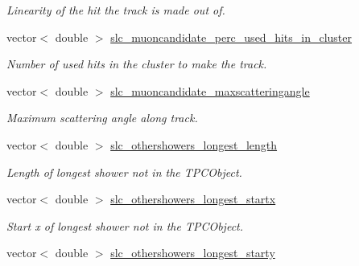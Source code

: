 \begin{DoxyCompactItemize}
\begin{DoxyCompactList}\small\item\em Linearity of the hit the track is made out of. \end{DoxyCompactList}\item 
\hypertarget{classUBXSecEvent_a946ace636527632fed09f2d9e075e87e}{vector$<$ double $>$ \hyperlink{classUBXSecEvent_a946ace636527632fed09f2d9e075e87e}{slc\-\_\-muoncandidate\-\_\-perc\-\_\-used\-\_\-hits\-\_\-in\-\_\-cluster}}\label{classUBXSecEvent_a946ace636527632fed09f2d9e075e87e}

\begin{DoxyCompactList}\small\item\em Number of used hits in the cluster to make the track. \end{DoxyCompactList}\item 
\hypertarget{classUBXSecEvent_ad1f8e0086022ff8db9be1bbe8860c6d1}{vector$<$ double $>$ \hyperlink{classUBXSecEvent_ad1f8e0086022ff8db9be1bbe8860c6d1}{slc\-\_\-muoncandidate\-\_\-maxscatteringangle}}\label{classUBXSecEvent_ad1f8e0086022ff8db9be1bbe8860c6d1}

\begin{DoxyCompactList}\small\item\em Maximum scattering angle along track. \end{DoxyCompactList}\item 
\hypertarget{classUBXSecEvent_a88a28d15f2610291b3cb37b15335ca20}{vector$<$ double $>$ \hyperlink{classUBXSecEvent_a88a28d15f2610291b3cb37b15335ca20}{slc\-\_\-othershowers\-\_\-longest\-\_\-length}}\label{classUBXSecEvent_a88a28d15f2610291b3cb37b15335ca20}

\begin{DoxyCompactList}\small\item\em Length of longest shower not in the T\-P\-C\-Object. \end{DoxyCompactList}\item 
\hypertarget{classUBXSecEvent_a6e6fbefbd4ffc86a1987dfdd8eafc1df}{vector$<$ double $>$ \hyperlink{classUBXSecEvent_a6e6fbefbd4ffc86a1987dfdd8eafc1df}{slc\-\_\-othershowers\-\_\-longest\-\_\-startx}}\label{classUBXSecEvent_a6e6fbefbd4ffc86a1987dfdd8eafc1df}

\begin{DoxyCompactList}\small\item\em Start x of longest shower not in the T\-P\-C\-Object. \end{DoxyCompactList}\item 
\hypertarget{classUBXSecEvent_ad21ee017ae26cebdf91a9c95264f9b04}{vector$<$ double $>$ \hyperlink{classUBXSecEvent_ad21ee017ae26cebdf91a9c95264f9b04}{slc\-\_\-othershowers\-\_\-longest\-\_\-starty}}\label{classUBXSecEvent_ad21ee017ae26cebdf91a9c95264f9b04}


\end{DoxyCompactItemize}
